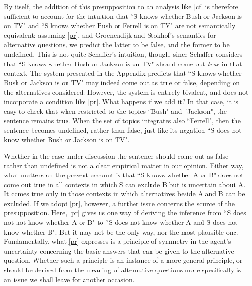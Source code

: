 By itself, the addition of this presupposition to an analysis like
\ref{cf} is therefore sufficient to account for the intuition that
``S knows whether Bush or Jackson is on TV" and ``S knows whether
Bush or Ferrell is on TV" are not semantically equivalent:
assuming \ref{pr}, and Groenendijk and Stokhof's semantics for
alternative questions, we predict the latter to be false, and the
former to be undefined. This is not quite Schaffer's intuition,
though, since Schaffer considers that ``S knows whether Bush or
Jackson is on TV" should come out \emph{true} in that context. The
system presented in the Appendix predicts that ``S knows whether
Bush or Jackson is on TV" may indeed come out as true or false,
depending on the alternatives considered. However, the system is
entirely bivalent, and does not incorporate a condition like
\ref{pr}. What happens if we add it? In that case, it is easy to
check that when restricted to the topics ``Bush" and ``Jackson",
the sentence remains true. When the set of topics integrates also
``Ferrell", then the sentence becomes undefined, rather than
false, just like its negation ``S does not know whether Bush or
Jackson is on TV".

Whether in the case under discussion the sentence should come out
as false rather than undefined is not a clear empirical matter in
our opinion. Either way, what matters on the present account is
that ``S knows whether A or B" does not come out true in all
contexts in which S can exclude B but is uncertain about A. It
comes true only in those contexts in which alternatives beside A
and B can be excluded. If we adopt \ref{pr}, however, a further
issue concerns the source of the presupposition. Here, \ref{pr}
gives us one way of deriving the inference from ``S does not not
know whether A or B" to ``S does not know whether A and S does not
know whether B". But it may not be the only way, nor the most
plausible one. Fundamentally, what \ref{pr} expresses is a
principle of symmetry in the agent's uncertainty concerning the
basic answers that can be given to the alternative question.
Whether such a principle is an instance of a more general
principle, or should be derived from the meaning of alternative
questions more specifically is an issue we shall leave for another
occasion.








